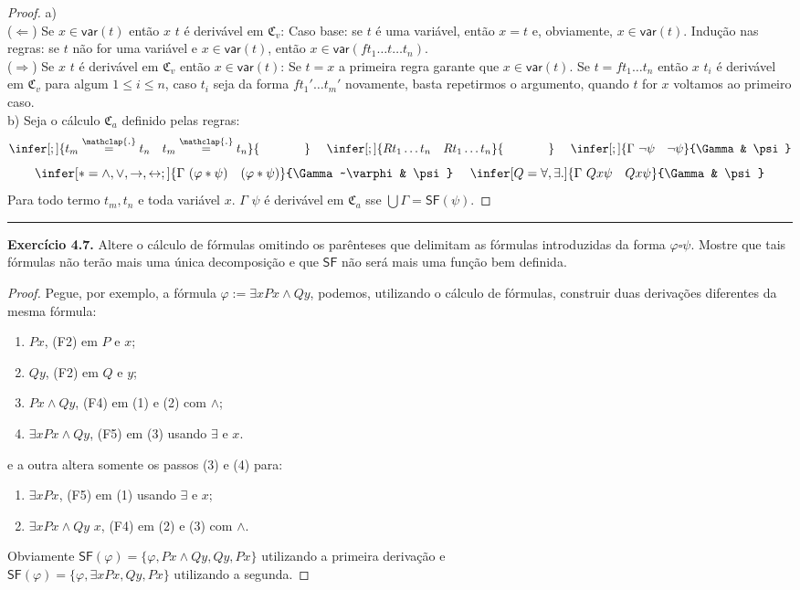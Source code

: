 \documentclass[11pt]{article}
\newcommand{\sse}{\leftrightarrow}
\newcommand{\mf}[1]{\mathfrak{#1}}
\newcommand{\msf}[1]{\mathsf{#1}}
\newcommand\overtext[2]{\stackrel{\mathclap{\normalfont\mbox{#1}}}{#2}}
\begin{document}
\begin{proof}
    a)\\
    ($\Leftarrow$) Se $x\in\msf{var}(t)$ então $x$ $t$ é derivável em $\mf{C}_v$: Caso base: se $t$ é uma variável, então $x=t$ e, obviamente, $x\in\msf{var}(t)$. Indução nas regras: se $t$ não for uma variável e $x\in\msf{var}(t)$, então $x\in\msf{var}(ft_1\dots t\dots t_n)$.\\
    ($\Rightarrow$) Se $x$ $t$ é derivável em $\mf{C}_v$ então $x\in\msf{var}(t)$: Se $t=x$ a primeira regra garante que $x\in\msf{var}(t)$. Se $t=ft_1\dots t_n$ então $x$ $t_i$ é derivável em $\mf{C}_v$ para algum $1\le i\le n$, caso $t_i$ seja da forma $ft_1'\dots t_m'$ novamente, basta repetirmos o argumento, quando $t$ for $x$ voltamos ao primeiro caso.\\
    b) Seja o cálculo $\mf{C}_a$ definido pelas regras:
    \[
    \infer[;]{t_m\overtext{.}{=} t_n~~~t_m\overtext{.}{=} t_n}{\phantom{aaaaaaa}}~~~~\infer[;]{Rt_1\dots t_n~~~Rt_1\dots t_n}{\phantom{aaaaaaa}}~~~~\infer[;]{\Gamma~\neg\psi~~~\neg\psi}{\Gamma & \psi}
    \]
    \[\infer[*=\wedge,\vee,\to,\sse;]{\Gamma~(\varphi*\psi)~~~(\varphi*\psi)}{\Gamma~\varphi & \psi}~~~~\infer[Q=\forall,\exists.]{\Gamma~Qx\psi~~~Qx\psi}{\Gamma & \psi}
    \]
    Para todo termo $t_m,t_n$ e toda variável $x$. $\Gamma$ $\psi$ é derivável em $\mf{C}_a$ sse $\bigcup\Gamma=\msf{SF}(\psi)$.
\end{proof}

\hrule

\begin{shaded}
\textbf{Exercício 4.7.} Altere o cálculo de fórmulas omitindo os parênteses que delimitam as fórmulas introduzidas da forma $\varphi\square\psi$. Mostre que tais fórmulas não terão mais uma única decomposição e que $\msf{SF}$ não será mais uma função bem definida.
\end{shaded}

\begin{proof}
    Pegue, por exemplo, a fórmula $\varphi:=\exists xPx\wedge Qy$, podemos, utilizando o cálculo de fórmulas, construir duas derivações diferentes da mesma fórmula:
    \begin{enumerate}
        \item $Px$, (F2) em $P$ e $x$;
        \item $Qy$, (F2) em $Q$ e $y$;
        \item $Px\wedge Qy$, (F4) em (1) e (2) com $\wedge$;
        \item $\exists xPx\wedge Qy$, (F5) em (3) usando $\exists$ e $x$.
    \end{enumerate}
    e a outra altera somente os passos (3) e (4) para:
    \begin{enumerate}
        \item $\exists xPx$, (F5) em (1) usando $\exists$ e $x$;
        \item $\exists xPx\wedge Qy$ $x$, (F4) em (2) e (3) com $\wedge$.
    \end{enumerate}
    Obviamente $\msf{SF}(\varphi)=\{\varphi,Px\wedge Qy,Qy,Px\}$ utilizando a primeira derivação e\\$\msf{SF}(\varphi)=\{\varphi, \exists xPx, Qy, Px\}$ utilizando a segunda.
\end{proof}
\end{document}
